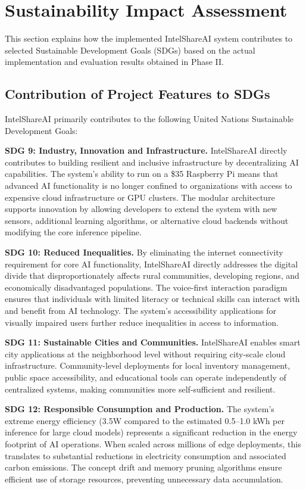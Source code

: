 \documentclass[12pt,a4paper]{report}
\begin{document}
\section{Sustainability Impact Assessment}
This section explains how the implemented IntelShareAI system contributes to selected Sustainable Development Goals (SDGs) based on the actual implementation and evaluation results obtained in Phase II.

\subsection{Contribution of Project Features to SDGs}
IntelShareAI primarily contributes to the following United Nations Sustainable Development Goals:

\textbf{SDG 9: Industry, Innovation and Infrastructure.} IntelShareAI directly contributes to building resilient and inclusive infrastructure by decentralizing AI capabilities. The system's ability to run on a \$35 Raspberry Pi means that advanced AI functionality is no longer confined to organizations with access to expensive cloud infrastructure or GPU clusters. The modular architecture supports innovation by allowing developers to extend the system with new sensors, additional learning algorithms, or alternative cloud backends without modifying the core inference pipeline.

\textbf{SDG 10: Reduced Inequalities.} By eliminating the internet connectivity requirement for core AI functionality, IntelShareAI directly addresses the digital divide that disproportionately affects rural communities, developing regions, and economically disadvantaged populations. The voice-first interaction paradigm ensures that individuals with limited literacy or technical skills can interact with and benefit from AI technology. The system's accessibility applications for visually impaired users further reduce inequalities in access to information.

\textbf{SDG 11: Sustainable Cities and Communities.} IntelShareAI enables smart city applications at the neighborhood level without requiring city-scale cloud infrastructure. Community-level deployments for local inventory management, public space accessibility, and educational tools can operate independently of centralized systems, making communities more self-sufficient and resilient.

\textbf{SDG 12: Responsible Consumption and Production.} The system's extreme energy efficiency (3.5W compared to the estimated 0.5--1.0 kWh per inference for large cloud models) represents a significant reduction in the energy footprint of AI operations. When scaled across millions of edge deployments, this translates to substantial reductions in electricity consumption and associated carbon emissions. The concept drift and memory pruning algorithms ensure efficient use of storage resources, preventing unnecessary data accumulation.
\end{document}
